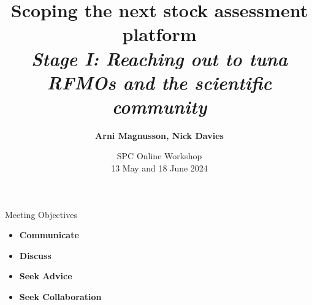 \documentclass[aspectratio=169,fleqn]{beamer}
\begin{document}
\begin{frame}
  \title{\vspace{-5ex}\darkblue Scoping the next stock assessment
    platform\\[2ex]
    \it\large\darkgray
    Stage I: Reaching out to tuna RFMOs and the scientific community}
  \author{\vspace{-10ex}\darkgray\bf
    Arni Magnusson, Nick Davies}
  \date{\darkgreen SPC Online Workshop\\[0.5ex]
    13 May and 18 June 2024}
  \titlepage
\end{frame}


\begin{frame}{Meeting Objectives}
  \begin{itemize}
    \item[] {\bf\darkblue Communicate} \\[5ex]
    \item[] {\bf\darkblue Discuss} \\[5ex]
    \item[] {\bf\darkblue Seek Advice} \\[5ex]
    \item[] {\bf\darkblue Seek Collaboration} \\[1ex]
  \end{itemize}
\end{frame}

\end{document}
